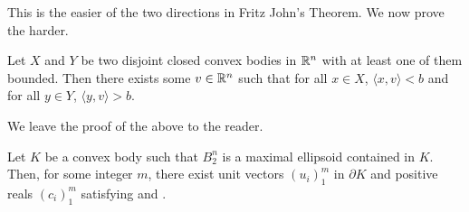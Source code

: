 This is the easier of the two directions in Fritz John's Theorem. We now prove the harder.

\begin{lemma}
\label{hyperplane separation theorem}
Let $X$ and $Y$ be two disjoint closed convex bodies in $\mathbb{R}^n$ with at least one of them bounded. Then there exists some $v\in\mathbb{R}^n$ such that for all $x\in X$, $\langle x,v\rangle<b$ and for all $y\in Y$, $\langle y,v\rangle>b$.
\end{lemma}
We leave the proof of the above to the reader.

\begin{lemma}
\label{fritz johns theorem part 2}
Let $K$ be a convex body such that $B_2^n$ is a maximal ellipsoid contained in $K$. Then, for some integer $m$, there exist unit vectors $(u_i)_1^m$ in $\partial K$ and positive reals $(c_i)_1^m$ satisfying  and .
\end{lemma}
